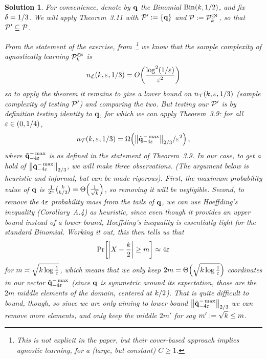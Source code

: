 \documentclass[biber,plain]{nowfnt} %
\newtheorem{solution}{Solution}[chapter]
\begin{document}
\begin{solution}
For convenience, denote by $\mathbf{q}$ the Binomial $\binomial{\ab}{1/2}$, and fix $\delta = 1/3$. We will apply Theorem~3.11 with $\mathcal{P}' := \{\mathbf{q}\}$ and $\mathcal{P} := \mathcal{P}^{\hspace{1pt}{\cdot}\kern -4pt {\subset}\kern -3pt {\rtimes}}_{k}$, so that $\mathcal{P}' \subseteq \mathcal{P}$.

From the statement of the exercise, from~\citep{DDS:PBD:15}\footnote{This is not explicit in the paper, but their cover-based approach implies agnostic learning, for a (large, but constant) $C\geq 1$.} we know that the sample complexity of agnostically learning $\mathcal{P}^{\hspace{1pt}{\cdot}\kern -4pt {\subset}\kern -3pt {\rtimes}}_{k}$ is
\[
	\ns_{\mathcal{L}}(\ab,\dst,1/3) = \bigO{\frac{\log^2(1/\dst)}{\dst^2}}
\]
so to apply the theorem it remains to give a lower bound on $n_{\mathcal{T}}(k,\varepsilon,1/3)$ (sample complexity of testing $\mathcal{P}'$) and comparing the two. But testing our $\mathcal{P}'$ is by definition testing identity to $\mathbf{q}$, for which we can apply Theorem~3.9: for all $\varepsilon\in(0,1/4)$, 
\[
		\ns_{\mathcal{T}}(\ab,\dst,1/3) = \bigOmega{\norm{\tilde{\q}^{-\max}_{-4\dst}}_{2/3}/\dst^2}\,,
\]
where $\tilde{\mathbf{q}}^{-\max}_{-4\varepsilon}$ is as defined in the statement of Theorem~3.9. In our case, to get a hold of 
$
	\norm{\tilde{\q}^{-\max}_{-4\dst}}_{2/3}
$, we will make three observations. \emph{(The argument below is heuristic and informal, but can be made rigorous).} First, the maximum probability value of $\mathbf{q}$ is $\frac{1}{2^n}\binom{\ab}{\ab/2} = \bigTheta{\frac{1}{\sqrt{\ab}}}$, so removing it will be negligible. Second, to remove the $4\varepsilon$ probability mass from the tails of $\mathbf{q}$, we can use Hoeffding's inequality (Corollary~A.4) as heuristic, since even though it provides an upper bound instead of a lower bound, Hoeffding's inequality is essentially tight for the standard Binomial. Working it out, this then tells us that
\[
	\bPr{ \abs{X - \frac{\ab}{2}} \geq m } \approx 4\dst 
\]
for $m \asymp \sqrt{k \log\frac{1}{\varepsilon}}$, which means that we only keep $2m = \bigTheta{\sqrt{\ab \log\frac{1}{\dst}}}$ coordinates in our vector $\tilde{\mathbf{q}}^{-\max}_{-4\varepsilon}$ (since $\mathbf{q}$ is symmetric around its expectation, those are the $2m$ middle elements of the domain, centered at $k/2$). That is quite difficult to bound, though, so since we are only aiming to \emph{lower bound} $\norm{\tilde{\q}^{-\max}_{-4\dst}}_{2/3}$ we can remove more elements, and only keep the middle $2m'$ for say $m' := \sqrt{k} \leq m$.



\end{solution}
\end{document}
